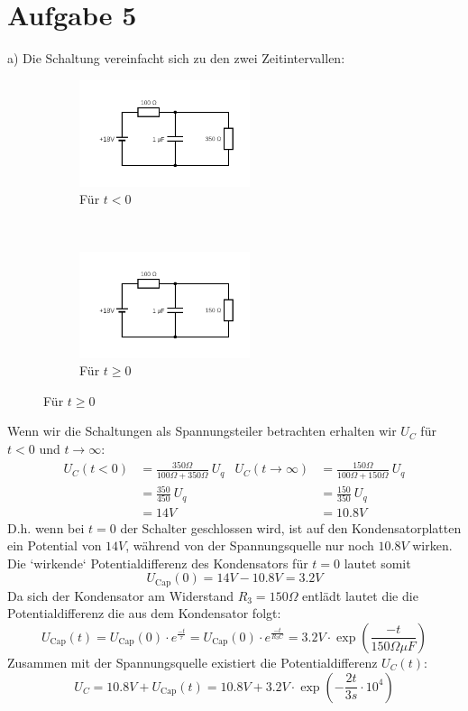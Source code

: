 \documentclass[11pt a4paper]{article}
\begin{document}
\section*{Aufgabe 5}

a) Die Schaltung vereinfacht sich zu den zwei Zeitintervallen:
\begin{figure}[H]
	\centering
	\begin{subfigure}[b]{0.3\textwidth}
		\includegraphics[width=5cm]{aufgabe5a_1.png}
		\caption{Für $t<0$}
	\end{subfigure}
	~
	\begin{subfigure}[b]{0.3\textwidth}
		\includegraphics[width=5cm]{aufgabe5a_2.png}
		\caption{Für $t\geq0$}
	\end{subfigure}
\end{figure}
Wenn wir die Schaltungen als Spannungsteiler betrachten erhalten wir $U_C$ 
für $t < 0$ und $t \rightarrow \infty$:
\begin{align*}
	U_C (t < 0) &= \frac{350 \Omega}{100 \Omega + 350 \Omega} \ U_q
	&
	U_C (t\rightarrow\infty) &= \frac{150\Omega}{100\Omega +
	150 \Omega} \ U_q\\
	&= \frac{350}{450} \ U_q & &= \frac{150}{350} \ U_q \\
	&= 14V & &=10.8V
\end{align*}
D.h. wenn bei $t=0$ der Schalter geschlossen wird, ist auf den 
Kondensatorplatten ein Potential von $14V$, während von der Spannungsquelle
nur noch $10.8V$ wirken.\\
Die `wirkende` Potentialdifferenz des Kondensators für $t=0$ lautet somit
\[ U_\text{Cap} (0) = 14V - 10.8V = 3.2V \]
Da sich der Kondensator am Widerstand $R_3 = 150\Omega$ entlädt lautet die
die Potentialdifferenz die aus dem Kondensator folgt:
\[
	U_\text{Cap} (t) = U_\text{Cap} (0) \cdot e^{\frac{-t}{\tau}}
	= U_\text{Cap} (0) \cdot e^{\frac{-t}{R_3 C}}
	= 3.2 V \cdot \exp\left(\frac{-t}{150\Omega \mu F}\right)
\]
Zusammen mit der Spannungsquelle existiert die Potentialdifferenz $U_C(t)$:
\[
	U_C = 10.8V + U_\text{Cap} (t) = 
	10.8V + 3.2 V \cdot  \exp\left( -\frac{2t}{3s} \cdot 10^4\right)
\]
\end{document}
